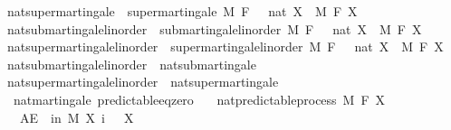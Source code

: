 \begin{isabellebody}
\isamarkupfalse%
\ nat{\isacharunderscore}{\kern0pt}supermartingale\ {\isacharequal}{\kern0pt}\ supermartingale\ M\ F\ {\isachardoublequoteopen}{}\ {\isacharcolon}{\kern0pt}{\isacharcolon}{\kern0pt}\ nat{\isachardoublequoteclose}\ X\ \ M\ F\ X\isanewline
\isanewline
{}\isamarkupfalse%
\ nat{\isacharunderscore}{\kern0pt}submartingale{\isacharunderscore}{\kern0pt}linorder\ {\isacharequal}{\kern0pt}\ submartingale{\isacharunderscore}{\kern0pt}linorder\ M\ F\ {\isachardoublequoteopen}{}\ {\isacharcolon}{\kern0pt}{\isacharcolon}{\kern0pt}\ nat{\isachardoublequoteclose}\ X\ \ M\ F\ X\isanewline
{}\isamarkupfalse%
\ nat{\isacharunderscore}{\kern0pt}supermartingale{\isacharunderscore}{\kern0pt}linorder\ {\isacharequal}{\kern0pt}\ supermartingale{\isacharunderscore}{\kern0pt}linorder\ M\ F\ {\isachardoublequoteopen}{}\ {\isacharcolon}{\kern0pt}{\isacharcolon}{\kern0pt}\ nat{\isachardoublequoteclose}\ X\ \ M\ F\ X\isanewline
\isanewline
{}\isamarkupfalse%
\ nat{\isacharunderscore}{\kern0pt}submartingale{\isacharunderscore}{\kern0pt}linorder\ {\isasymsubseteq}\ nat{\isacharunderscore}{\kern0pt}submartingale%
\isadelimproof
\ %
\endisadelimproof
%
\isatagproof
\isacommand{{\isachardot}{\kern0pt}{\isachardot}{\kern0pt}}\isamarkupfalse%
%
\endisatagproof
{\isafoldproof}%
%
\isadelimproof
%
\endisadelimproof
\isanewline
{}\isamarkupfalse%
\ nat{\isacharunderscore}{\kern0pt}supermartingale{\isacharunderscore}{\kern0pt}linorder\ {\isasymsubseteq}\ nat{\isacharunderscore}{\kern0pt}supermartingale%
\isadelimproof
\ %
\endisadelimproof
%
\isatagproof
\isacommand{{\isachardot}{\kern0pt}{\isachardot}{\kern0pt}}\isamarkupfalse%
%
\endisatagproof
{\isafoldproof}%
%
\isadelimproof
%
\endisadelimproof
%
\isadelimdocument
%
\endisadelimdocument
%
\isatagdocument
%
\isamarkuptrue%
%
\endisatagdocument
{\isafolddocument}%
%
\isadelimdocument
%
\endisadelimdocument
{}\isamarkupfalse%
\ {\isacharparenleft}{\kern0pt}\ nat{\isacharunderscore}{\kern0pt}martingale{\isacharparenright}{\kern0pt}\ predictable{\isacharunderscore}{\kern0pt}eq{\isacharunderscore}{\kern0pt}zero{\isacharcolon}{\kern0pt}\isanewline
\ \ \ {\isachardoublequoteopen}nat{\isacharunderscore}{\kern0pt}predictable{\isacharunderscore}{\kern0pt}process\ M\ F\ X{\isachardoublequoteclose}\isanewline
\ \ \ {\isachardoublequoteopen}AE\ {\isasymxi}\ in\ M{\isachardot}{\kern0pt}\ X\ i\ {\isasymxi}\ {\isacharequal}{\kern0pt}\ X\ {}\ {\isasymxi}{\isachardoublequoteclose}\isanewline

\end{isabellebody}
